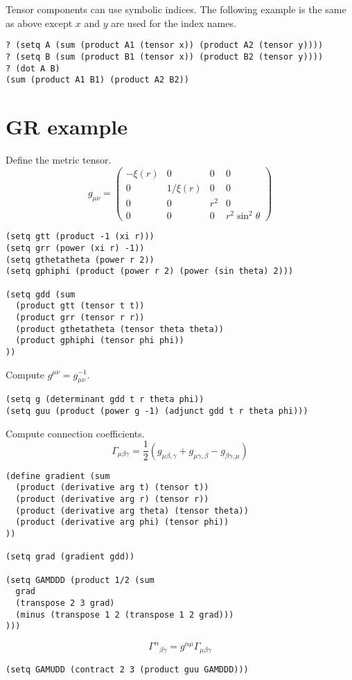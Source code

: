 \documentclass[12pt]{article}
\begin{document}
Tensor components can use symbolic indices.
The following example is the same as above except $x$ and $y$ are used for the index names.
\begin{verbatim}
? (setq A (sum (product A1 (tensor x)) (product A2 (tensor y))))
? (setq B (sum (product B1 (tensor x)) (product B2 (tensor y))))
? (dot A B)
(sum (product A1 B1) (product A2 B2))
\end{verbatim}

\section*{GR example}

Define the metric tensor.
\begin{equation*}
g_{\mu\nu}=\begin{pmatrix}
-\xi(r) & 0 & 0 & 0
\\
0 & 1/\xi(r) & 0 & 0
\\
0 & 0 & r^2 & 0
\\
0 & 0 & 0 & r^2\sin^2\theta
\end{pmatrix}
\end{equation*}
\begin{verbatim}
(setq gtt (product -1 (xi r)))
(setq grr (power (xi r) -1))
(setq gthetatheta (power r 2))
(setq gphiphi (product (power r 2) (power (sin theta) 2)))

(setq gdd (sum
  (product gtt (tensor t t))
  (product grr (tensor r r))
  (product gthetatheta (tensor theta theta))
  (product gphiphi (tensor phi phi))
))
\end{verbatim}

Compute $g^{\mu\nu}=g_{\mu\nu}^{-1}$.
\begin{verbatim}
(setq g (determinant gdd t r theta phi))
(setq guu (product (power g -1) (adjunct gdd t r theta phi)))
\end{verbatim}

Compute connection coefficients.
\begin{equation*}
\Gamma_{\mu\beta\gamma}=\frac{1}{2}
(g_{\mu\beta,\gamma}+g_{\mu\gamma,\beta}-g_{\beta\gamma,\mu})
\end{equation*}
%
\begin{verbatim}
(define gradient (sum
  (product (derivative arg t) (tensor t))
  (product (derivative arg r) (tensor r))
  (product (derivative arg theta) (tensor theta))
  (product (derivative arg phi) (tensor phi))
))

(setq grad (gradient gdd))

(setq GAMDDD (product 1/2 (sum
  grad
  (transpose 2 3 grad)
  (minus (transpose 1 2 (transpose 1 2 grad)))
)))
\end{verbatim}
%
\begin{equation*}
\Gamma^\alpha{}_{\beta\gamma}=g^{\alpha\mu}\Gamma_{\mu\beta\gamma}
\end{equation*}
%
\begin{verbatim}
(setq GAMUDD (contract 2 3 (product guu GAMDDD)))
\end{verbatim}
\end{document}
